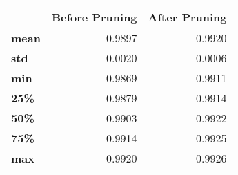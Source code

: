 \begin{tabular}{lrr}
\toprule
{} &  Before Pruning &  After Pruning \\
\midrule
\textbf{mean} &          0.9897 &         0.9920 \\
\textbf{std } &          0.0020 &         0.0006 \\
\textbf{min } &          0.9869 &         0.9911 \\
\textbf{25\% } &          0.9879 &         0.9914 \\
\textbf{50\% } &          0.9903 &         0.9922 \\
\textbf{75\% } &          0.9914 &         0.9925 \\
\textbf{max } &          0.9920 &         0.9926 \\
\bottomrule
\end{tabular}
